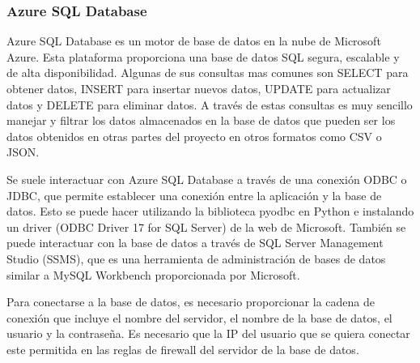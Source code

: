 \subsubsection{Azure SQL Database}

Azure SQL Database es un motor de base de datos en la nube de Microsoft Azure.
Esta plataforma proporciona una base de datos SQL segura, escalable y de alta disponibilidad.\cite{azure}
Algunas de sus consultas mas comunes son SELECT para obtener datos, INSERT para insertar nuevos datos, UPDATE para actualizar datos y DELETE para eliminar datos.
A través de estas consultas es muy sencillo manejar y filtrar los datos almacenados en la base de datos que pueden ser los datos obtenidos en otras partes del proyecto en otros formatos como CSV o JSON.

Se suele interactuar con Azure SQL Database a través de una conexión ODBC o JDBC, que permite establecer una conexión entre la aplicación y la base de datos. 
Esto se puede hacer utilizando la biblioteca pyodbc en Python e instalando un driver (ODBC Driver 17 for SQL Server) de la web de Microsoft. 
También se puede interactuar con la base de datos a través de SQL Server Management Studio (SSMS), que es una herramienta de administración de bases de datos similar a MySQL Workbench proporcionada por Microsoft.

Para conectarse a la base de datos, es necesario proporcionar la cadena de conexión que incluye el nombre del servidor, el nombre de la base de datos, el usuario y la contraseña.
Es necesario que la IP del usuario que se quiera conectar este permitida en las reglas de firewall del servidor de la base de datos.